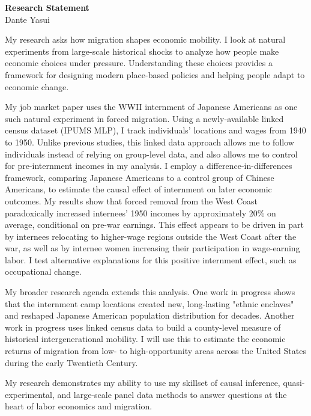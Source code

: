 \begin{center}
  \textbf{Research Statement}
  \\
  Dante Yasui
\end{center}

My research asks how migration shapes economic mobility.
I look at natural experiments from large-scale historical shocks
to analyze how people make economic choices under pressure.
Understanding these choices provides a framework
for designing modern place-based policies
and helping people adapt to economic change.

My job market paper uses the WWII internment of Japanese Americans
as one such natural experiment in forced migration.
Using a newly-available linked census dataset (IPUMS MLP),
I track individuals' locations and wages from 1940 to 1950.
Unlike previous studies, this linked data approach
allows me to follow individuals instead of relying on group-level data,
and also allows me to control for pre-internment incomes in my analysis.
I employ a difference-in-differences framework,
comparing Japanese Americans to a control group of Chinese Americans,
to estimate the causal effect of internment on later economic outcomes.
My results show that forced removal from the West Coast
paradoxically increased internees' 1950 incomes by approximately 20\% on average,
conditional on pre-war earnings.
This effect appears to be driven in part
by internees relocating to higher-wage regions
outside the West Coast after the war,
as well as by internee women increasing their participation
in wage-earning labor.
I test alternative explanations for this positive internment effect,
such as occupational change.

My broader research agenda extends this analysis.
One work in progress shows that the
internment camp locations created new, long-lasting "ethnic enclaves"
and reshaped Japanese American population distribution for decades.
Another work in progress uses linked census data
to build a county-level measure of historical intergenerational mobility.
I will use this to estimate the economic returns of migration
from low- to high-opportunity areas
across the United States during the early Twentieth Century.

My research demonstrates my ability to use my skillset of
causal inference, quasi-experi\-mental,
and large-scale panel data methods
to answer questions at the heart of labor economics and migration.
